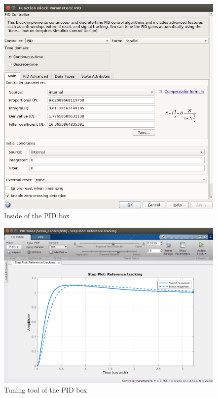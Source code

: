 \begin{figure}[H]
\centering
\includegraphics[scale=0.4]{figures/PID_window.png}
\caption{Inside of the PID box}
\label{dcmotor_circuit}
\end{figure}


\begin{figure}[H]
\centering
\includegraphics[scale=0.4]{figures/PID_param.png}
\caption{Tuning tool of the PID box}
\label{dcmotor_circuit}
\end{figure}
  


